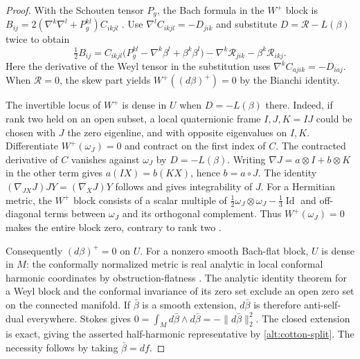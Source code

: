 \begin{proof}
With the Schouten tensor \(P_g\), the Bach formula in the
\(W^+\) block is
\(B_{ij}=2(\nabla^k\nabla^l+P_g^{kl})C_{ikjl}\)
\cite[\S3, p.~78]{LeBrun2013EinsteinExtremal}.
Use \(\nabla^l C_{ikjl}=-D_{jik}\) and substitute
\(D=\mathcal R-L(\beta)\) twice to obtain
\begin{equation}\label{alt:cotton-bach}
 \tfrac12 B_{ij}
 =C_{ikjl}\bigl(P_g^{kl}-\nabla^k\beta^l+\beta^k\beta^l\bigr)
       -\nabla^k\mathcal R_{jik}-\beta^k\mathcal R_{ikj}.
\end{equation}
Here the derivative of the Weyl tensor in the substitution
uses \(\nabla^k C_{ajik}=-D_{iaj}\).
When \(\mathcal R=0\), the skew part yields
\(W^+((d\beta)^+)=0\) by the Bianchi identity.

The invertible locus of \(W^+\) is dense in \(U\) when
\(D=-L(\beta)\) there. Indeed, if rank two held on an open
subset, a local quaternionic frame \(I,J,K=IJ\) could be
chosen with \(J\) the zero eigenline, and with opposite
eigenvalues on \(I,K\). Differentiate \(W^+(\omega_J)=0\)
and contract on the first index of \(C\). The contracted
derivative of \(C\) vanishes against \(\omega_J\) by
\(D=-L(\beta)\). Writing \(\nabla J=a\otimes I+b\otimes K\)
in the other term gives \(a(IX)=b(KX)\), hence \(b=a\circ J\).
The identity \((\nabla_{JX}J)JY=(\nabla_XJ)Y\) follows and
gives integrability of \(J\). For a Hermitian metric,
the \(W^+\) block consists of a scalar multiple of
\(\tfrac12\omega_J\otimes\omega_J-\tfrac13\operatorname{Id}\)
and off-diagonal terms between \(\omega_J\) and its
orthogonal complement. Thus \(W^+(\omega_J)=0\) makes the
entire block zero, contrary to rank two
\cite[\S4, Theorem 4.1 and proof of Proposition 4.1]{GoverNagy2007FourDimensional}.

Consequently \((d\beta)^+=0\) on \(U\).
For a nonzero smooth Bach-flat block, \(U\) is dense in \(M\):
the conformally normalized metric is real analytic in local
conformal harmonic coordinates by obstruction-flatness
\cite[Theorems 2.2 and 3.7(c)]{LassasLiimatainen2019ConformalHarmonic}.
The analytic identity theorem for a Weyl block and the conformal
invariance of its zero set exclude an open zero set on the
connected manifold. If \(\bar\beta\) is a smooth extension,
\(d\bar\beta\) is therefore anti-self-dual everywhere. Stokes
gives \(0=\int_M d\bar\beta\wedge d\bar\beta
=-\|d\bar\beta\|_2^2\). The closed extension is exact, giving
the asserted half-harmonic representative by \eqref{alt:cotton-split}.
The necessity follows by taking \(\bar\beta=df\).


\end{proof}
